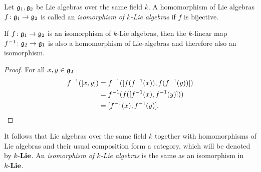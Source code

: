 \begin{defi}
 Let $\mathfrak{g}_1, \mathfrak{g}_2$ be Lie algebras over the same field $k$. A homomorphism of Lie algebras $f \colon \mathfrak{g}_1 \to \mathfrak{g}_2$ is called an \emph{isomorphism of $k$-Lie algebras} if $f$ is bijective.
\end{defi}


\begin{lem}
 If $f \colon \mathfrak{g}_1 \to \mathfrak{g}_2$ is an isomorphism of $k$-Lie algebras, then the $k$-linear map $f^{-1} \colon \mathfrak{g}_2 \to \mathfrak{g}_1$ is also a homomorphism of Lie-algebras and therefore also an isomorphism.
\end{lem}
\begin{proof}
 For all $x,y \in \mathfrak{g}_2$
 \begin{align*}
  f^{-1}( [x,y] )
  &= f^{-1}( [ f(f^{-1}(x)), f(f^{-1}(y)) ] ) \\
  &= f^{-1}(f( [f^{-1}(x) , f^{-1}(y)] )) \\
  &= [f^{-1}(x), f^{-1}(y)].
 \qedhere
 \end{align*}
\end{proof}


\begin{rem}
 It follows that Lie algebras over the same field $k$ together with homomorphisms of Lie algebras and their usual composition form a category, which will be denoted by $k\text{-}\mathbf{Lie}$. An \emph{isomorphism of $k$-Lie algebras} is the same as an isomorphism in $k\text{-}\mathbf{Lie}$.
\end{rem}


